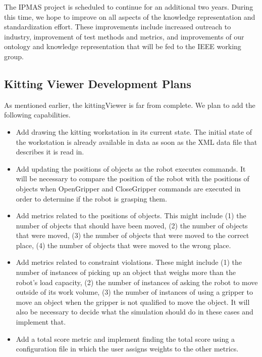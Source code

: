 The IPMAS project is scheduled to continue for an additional two years. During this time,
we hope to improve on all aspects of the knowledge representation and standardization
effort. These improvements include increased outreach to industry, improvement of
test methods and metrics, and improvements of our ontology and knowledge
representation that will be fed to the IEEE working group.

\subsection{Kitting Viewer Development Plans}

As mentioned earlier, the kittingViewer is far from complete.
We plan to add the following capabilities.

\begin{itemize}

\item Add drawing the kitting workstation in its current state. The initial
  state of the workstation is already available in data as soon as the XML
  data file that describes it is read in.

\item Add updating the positions of objects as the robot executes commands.
  It will be necessary to compare the position of the robot with the
  positions of objects when OpenGripper and CloseGripper commands are
  executed in order to determine if the robot is grasping them.

\item Add metrics related to the positions of objects. This might include
  (1) the number of objects that should have been moved, (2) the number of
  objects that were moved, (3) the number of objects that were moved to the
  correct place, (4) the number of objects that were moved to the wrong
  place.

\item Add metrics related to constraint violations. These might include (1)
  the number of instances of picking up an object that weighs more than the
  robot's load capacity, (2) the number of instances of asking the robot to move
  outside of its work volume, (3) the number of instances of using a
  gripper to move an object when the gripper is not qualified to move the
  object. It will also be necessary to decide what the simulation should do
  in these cases and implement that.

\item Add a total score metric and implement finding the total score using
  a configuration file in which the user assigns weights to the other
  metrics.
\end{itemize} 

